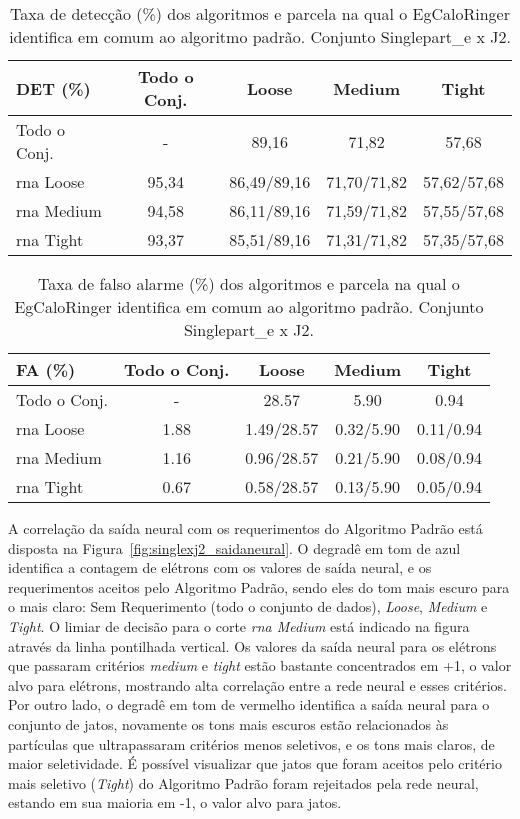 \begin{table}[htb]
\centering
\begin{tabular}{l cccc}
\hline
\hline
DET (\%)& Todo o Conj. & Loose & Medium & Tight \\
\hline
Todo o Conj. &  - & 89,16 & 71,82 & 57,68 \\
\hline
\gls{rna} Loose & 95,34 & 86,49/89,16 & 71,70/71,82 & 57,62/57,68 \\
\hline
\gls{rna} Medium & 94,58  & 86,11/89,16 & 71,59/71,82 & 57,55/57,68 \\
\hline
\gls{rna} Tight &  93,37 & 85,51/89,16 &  71,31/71,82 & 57,35/57,68 \\
\hline
\hline
\end{tabular}
\caption{Taxa de detecção (\%) dos algoritmos e parcela na qual o EgCaloRinger
identifica em comum ao algoritmo padrão. Conjunto Singlepart\_e x J2.}
\label{tab:singlexj2_efic_det}
\end{table}

\begin{table}[htb]
\centering
\begin{tabular}{l cccc}
\hline
\hline
FA (\%)& Todo o Conj. & Loose & Medium & Tight \\
\hline
Todo o Conj. & - & 28.57 & 5.90 &  0.94 \\
\gls{rna} Loose  & 1.88  & 1.49/28.57 & 0.32/5.90 & 0.11/0.94 \\
\gls{rna} Medium & 1.16  & 0.96/28.57 & 0.21/5.90 & 0.08/0.94 \\
\gls{rna} Tight  & 0.67  & 0.58/28.57 & 0.13/5.90 & 0.05/0.94 \\
\hline
\hline
\end{tabular}
\caption{Taxa de falso alarme (\%) dos algoritmos e parcela na qual o EgCaloRinger
identifica em comum ao algoritmo padrão. Conjunto Singlepart\_e x J2.}
\label{tab:singlexj2_fa_det}
\end{table}

A correlação da saída neural com os requerimentos do Algoritmo Padrão está
disposta na Figura~\ref{fig:singlexj2_saidaneural}. O degradê em tom de azul
identifica a contagem de elétrons com os valores de saída neural, e os
requerimentos aceitos pelo Algoritmo Padrão, sendo eles do tom mais escuro para
o mais claro: Sem Requerimento (todo o conjunto de dados), \emph{Loose},
\emph{Medium} e \emph{Tight}. O limiar de decisão para o corte \emph{\gls{rna}
Medium} está indicado na figura através da linha pontilhada vertical. Os valores
da saída neural para os elétrons que passaram critérios \emph{medium} e
\emph{tight} estão bastante concentrados em +1, o valor alvo para elétrons,
mostrando alta correlação entre a rede neural e esses critérios. Por outro lado,
o degradê em tom de vermelho identifica a saída neural para o conjunto de jatos,
novamente os tons mais escuros estão relacionados às partículas que
ultrapassaram critérios menos seletivos, e os tons mais claros, de maior
seletividade. É possível visualizar que jatos que foram aceitos pelo critério
mais seletivo (\emph{Tight}) do Algoritmo Padrão foram rejeitados pela rede neural, 
estando em sua maioria em -1, o valor alvo para jatos.

